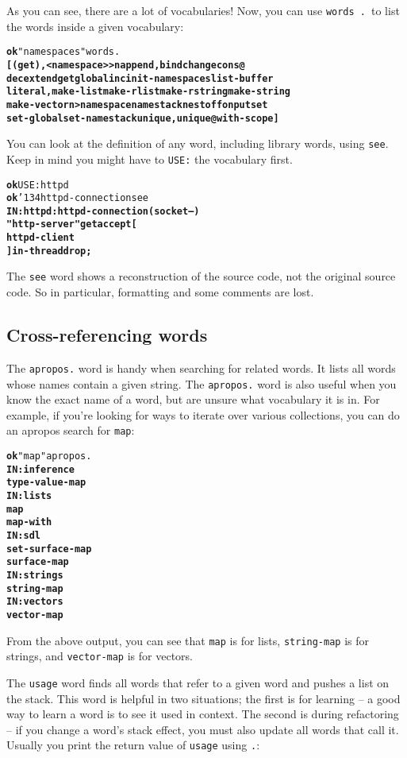 \documentclass{report}
\newcommand{\bs}{\char'134}
\begin{document}
As you can see, there are a lot of vocabularies! Now, you can use \texttt{words .}~to list the words inside a given vocabulary:

\begin{alltt}
\textbf{ok} "namespaces" words .
\textbf{[ (get) , <namespace> >n append, bind change cons@
dec extend get global inc init-namespaces list-buffer
literal, make-list make-rlist make-rstring make-string
make-vector n> namespace namestack nest off on put set
set-global set-namestack unique, unique@ with-scope ]}
\end{alltt}

You can look at the definition of any word, including library words, using \texttt{see}. Keep in mind you might have to \texttt{USE:} the vocabulary first.

\begin{alltt}
\textbf{ok} USE: httpd
\textbf{ok} \bs httpd-connection see
\textbf{IN: httpd : httpd-connection ( socket -- )
    "http-server" get accept [
        httpd-client
    ] in-thread drop ;}
\end{alltt}

The \texttt{see} word shows a reconstruction of the source code, not the original source code. So in particular, formatting and some comments are lost.

\subsection{Cross-referencing words}

The \texttt{apropos.} word is handy when searching for related words. It lists all words
whose names contain a given string. The \texttt{apropos.} word is also useful when you know the exact name of a word, but are unsure what vocabulary it is in. For example, if you're looking for ways to iterate over various collections, you can do an apropos search for \texttt{map}:

\begin{alltt}
\textbf{ok} "map" apropos.
\textbf{IN: inference
type-value-map
IN: lists
map
map-with
IN: sdl
set-surface-map
surface-map
IN: strings
string-map
IN: vectors
vector-map}
\end{alltt}

From the above output, you can see that \texttt{map} is for lists, \texttt{string-map} is for strings, and \texttt{vector-map} is for vectors.

The \texttt{usage} word finds all words that refer to a given word and pushes a list on the stack. This word is helpful in two situations; the first is for learning -- a good way to learn a word is to see it used in context. The second is during refactoring -- if you change a word's stack effect, you must also update all words that call it. Usually you print the
return value of \texttt{usage} using \texttt{.}:
\end{document}
